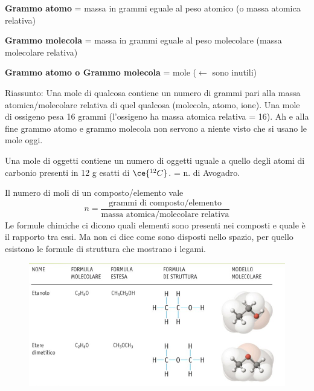 \textbf{Grammo atomo} = massa in grammi eguale al peso atomico (o 
massa atomica relativa)

\textbf{Grammo molecola} = massa in grammi eguale al peso molecolare (massa molecolare relativa)

\textbf{Grammo atomo o Grammo molecola} = mole ($\leftarrow$ sono inutili)

Riassunto: Una mole di qualcosa contiene un numero di grammi pari alla massa atomica/molecolare relativa  di quel qualcosa (molecola,  atomo, ione). Una mole di ossigeno pesa 16 grammi (l'ossigeno ha massa atomica relativa = 16). Ah e alla fine grammo atomo e grammo molecola non servono a niente visto che si usano le mole oggi.

Una mole di oggetti contiene un numero di oggetti uguale a quello degli atomi di carbonio presenti in 12 g esatti di \(\ce{ ^{12}C }\). = n. di Avogadro.

Il numero di moli di un composto/elemento vale
$$n=\frac{\text{grammi di composto/elemento}}{\text{massa atomica/molecolare relativa}}$$
Le formule chimiche ci dicono quali elementi sono presenti nei composti e quale è il rapporto tra essi. Ma non ci dice come sono disposti nello spazio, per quello esistono le formule di struttura che mostrano i legami.
\begin{figure}[htp]
    \centering
    \includegraphics[width=18cm]{immagini/formula.jpg}
\end{figure}\\